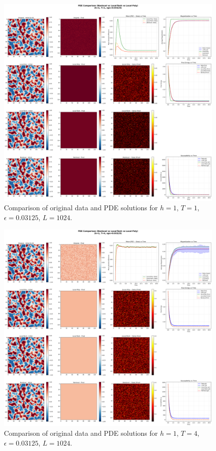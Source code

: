 \documentclass[11pt,a4paper]{article}
\begin{document}
\begin{figure}[!h]
    \centering
    \includegraphics[width=1.0\textwidth]{fig/compare_pde_solvers_L1024_h1_T1_eps0.03125.png}
    \caption{Comparison of original data and PDE solutions for $h=1$, $T=1$, $\epsilon=0.03125$, $L=1024$.}
    \label{fig:pde_comparison_h1_T1_eps0.03125}
\end{figure}


\begin{figure}[h]
    \centering
    \includegraphics[width=1.0\textwidth]{fig/compare_pde_solvers_L1024_h1_T4_eps0.03125.png}
    \caption{Comparison of original data and PDE solutions for $h=1$, $T=4$, $\epsilon=0.03125$, $L=1024$.}
    \label{fig:pde_comparison_h1_T4_eps0.03125}
\end{figure}
\end{document}

